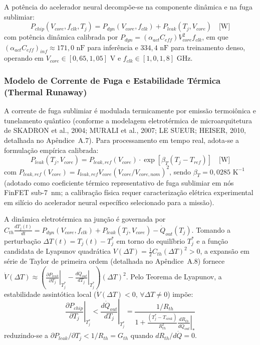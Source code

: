 A potência do acelerador neural decompõe-se na componente dinâmica e na fuga sublimiar:
\begin{equation}
    P_{chip}(V_{core}, f_{clk}, T_j) = P_{dyn}(V_{core}, f_{clk}) + P_{leak}(T_j, V_{core}) \quad \text{[W]}
    \label{eq:potencia_total_chip_rigorosa}
\end{equation}
com potência dinâmica calibrada por $P_{dyn} = (\alpha_{act} C_{eff}) V_{core}^2 f_{clk}$, em que $(\alpha_{act} C_{eff})_{inf} \approx 171{,}0\text{ nF}$ para inferência e $334{,}4\text{ nF}$ para treinamento denso, operando em $V_{core} \in [0{,}65, 1{,}05]\text{ V}$ e $f_{clk} \in [1{,}0, 1{,}8]\text{ GHz}$.

\subsubsection{Modelo de Corrente de Fuga e Estabilidade Térmica (Thermal Runaway)}

A corrente de fuga sublimiar é modulada termicamente por emissão termoiônica e tunelamento quântico (conforme a modelagem eletrotérmica de microarquitetura de SKADRON et al., 2004; MURALI et al., 2007; LE SUEUR; HEISER, 2010, detalhada no Apêndice~A.7). Para processamento em tempo real, adota-se a formulação empírica calibrada:
\begin{equation}
    P_{leak}(T_j, V_{core}) = P_{leak,ref}(V_{core}) \cdot \exp\left[ \beta_T \left( T_j - T_{ref} \right) \right] \quad \text{[W]}
    \label{eq:potencia_fuga_calibrada_local}
\end{equation}
com $P_{leak,ref}(V_{core}) = I_{leak,ref} V_{core} (V_{core}/V_{core,nom})^2$, sendo $\beta_T = 0{,}0285\text{ K}^{-1}$ (adotado como coeficiente térmico representativo de fuga sublimiar em nós FinFET sub-7~nm; a calibração física requer caracterização elétrica experimental em silício do acelerador neural específico selecionado para a missão).

A dinâmica eletrotérmica na junção é governada por $C_{th} \frac{dT_j(t)}{dt} = P_{dyn}(V_{core}, f_{clk}) + P_{leak}(T_j, V_{core}) - \dot{Q}_{out}(T_j)$. Tomando a perturbação $\Delta T(t) = T_j(t) - T_j^*$ em torno do equilíbrio $T_j^*$ e a função candidata de Lyapunov quadrática $V(\Delta T) = \frac{1}{2} C_{th} (\Delta T)^2 > 0$, a expansão em série de Taylor de primeira ordem (detalhada no Apêndice~A.8) fornece $\dot{V}(\Delta T) \approx \left( \left. \frac{\partial P_{leak}}{\partial T_j} \right|_{T_j^*} - \left. \frac{d\dot{Q}_{out}}{dT_j} \right|_{T_j^*} \right) (\Delta T)^2$. Pelo Teorema de Lyapunov, a estabilidade assintótica local ($\dot{V}(\Delta T) < 0, \, \forall \Delta T \neq 0$) impõe:
\begin{equation}
    \left. \frac{\partial P_{chip}}{\partial T_j} \right|_{T_j^*} < \left. \frac{d\dot{Q}_{out}}{dT_j} \right|_{T_j^*} = \frac{1/R_{th}}{1+\frac{(T_j^*-T_{sink})}{R_{th}^{2}}\left.\frac{dR_{th}}{d\dot Q_{out}}\right|_*}
    \label{eq:criterio_estabilidade_box}
\end{equation}
reduzindo-se a $\partial P_{leak}/\partial T_j < 1/R_{th} = G_{th}$ quando $dR_{th}/d\dot{Q} = 0$.

